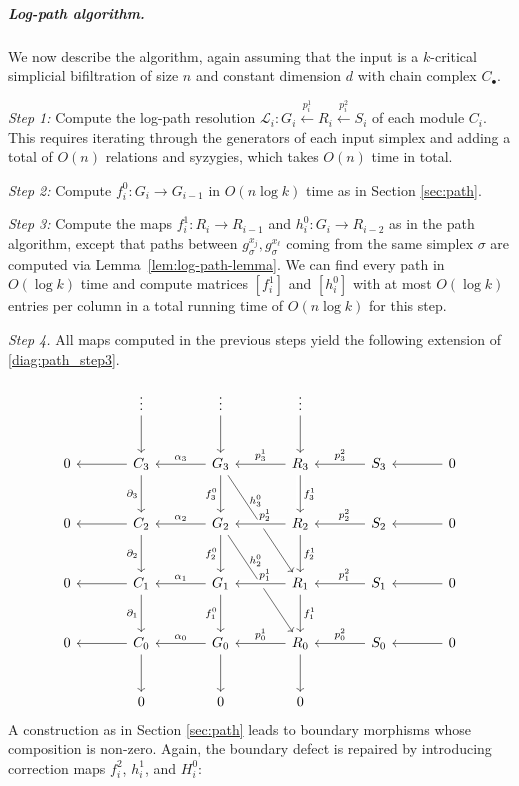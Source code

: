 \documentclass[a4paper,UKenglish,cleveref,nolineno,autoref]{socg-lipics-v2021}
\begin{document}
\subparagraph{Log-path algorithm.}
We now describe the algorithm, again assuming that the input is a $k$-critical simplicial bifiltration of size $n$ and constant dimension $d$ with chain complex $C_\bullet$.

\textit{Step 1:} Compute the log-path resolution $\mathcal{L}_i:G_i\xleftarrow{p^1_i} R_i \xleftarrow{p^2_i}S_i$ of each module $C_i$. This requires iterating through the generators of each input simplex and adding a total of $O(n)$ relations and syzygies, which takes $O(n)$ time in total. 

\textit{Step 2:} Compute $f^0_i:G_i\rightarrow G_{i-1}$ in $O(n \log k)$ time as in Section \ref{sec:path}.

\textit{Step 3:} Compute the maps $f^1_i:R_i\rightarrow R_{i-1}$ and $h^0_i:G_i\rightarrow R_{i-2}$ as in the path algorithm, except that paths
between $g_\sigma^{x_j},g_\sigma^{x_\ell}$ coming from the same simplex $\sigma$
are computed via Lemma~\ref{lem:log-path-lemma}.
We can find every path in $O(\log k)$ time
and compute matrices $[f^1_i]$ and $[h^0_i]$ with at most $O(\log k)$
entries per column in a total running time of $O(n\log k)$ for this step.

\textit{Step 4.} All maps computed in the previous steps yield the following extension of \eqref{diag:path_step3}.

\vspace{-12pt}
\begin{equation} \label{diag:logpath_double_complex_incomplete}
\begin{tikzcd} [column sep=large,row sep=large]
& \vdots \arrow[d] & \vdots \arrow[d] & \vdots \arrow[d] \\
0 & C_3 \arrow[l] \arrow[d,swap,"\partial_3"] & G_3 \arrow[l,swap,"\alpha_3"] \arrow[d,swap,"f_3^0"] \arrow[ddr,"h_3^0"{xshift=-10pt,yshift=10pt}] & R_3 \arrow[l,swap,"p_3^1"] \arrow[d,crossing over,"f_3^1"] & S_3 \arrow[l,swap,"p^2_3"] & 0 \arrow[l] \\
0 & C_2 \arrow[l] \arrow[d,swap,"\partial_2"] & G_2 \arrow[l,swap,"\alpha_2"] \arrow[d,swap,"f_2^0"] \arrow[ddr,"h_2^0"{xshift=-10pt,yshift=10pt}] & R_2 \arrow[l,swap,"p_2^1"{xshift=3pt},crossing over] \arrow[d,"f_2^1"] & S_2 \arrow[l,swap,"p^2_2"{xshift=3pt},crossing over]  & 0 \arrow[l] \\
0 & C_1 \arrow[l] \arrow[d,swap,"\partial_1"] & G_1 \arrow[l,swap,"\alpha_1"] \arrow[d,swap,"f_1^0"] & R_1 \arrow[l,swap,"p_1^1"{xshift=3pt},crossing over] \arrow[d,"f_1^1"] & S_1 \arrow[l,swap,"p^2_1"{xshift=3pt},crossing over] & 0 \arrow[l] \\
0 & C_0 \arrow[l] \arrow[d] & G_0 \arrow[l,swap,"\alpha_0"] \arrow[d] & R_0 \arrow[l,swap,"p_0^1"] \arrow[d] & S_0 \arrow[l,swap,"p^2_0"] & 0 \arrow[l] \\
& 0 & 0 & 0 
\end{tikzcd}
\end{equation} 
\noindent 
A construction as in Section \ref{sec:path} leads to boundary morphisms whose composition is non-zero. Again, the boundary defect is repaired by introducing correction maps $f^2_i$, $h^1_i$, and $H^0_i$:
\end{document}
